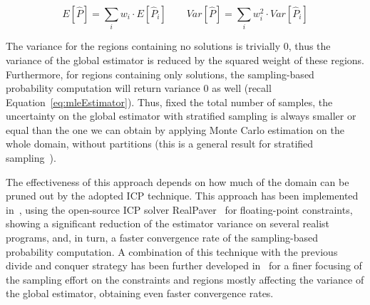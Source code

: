 \begin{equation}\label{eq:stratifiedSampling}
	E[\hat{P}]=\sum_i w_i \cdot E[\hat{P}_i] \qquad Var[\hat{P}] = \sum_i w_i^2 \cdot Var[\hat{P}_i]
\end{equation}

The variance for the regions containing no solutions is trivially 0, thus the variance of the global estimator is reduced by the squared weight of these regions. Furthermore, for regions containing only solutions, the sampling-based probability computation will return variance 0 as well (recall Equation~\eqref{eq:mleEstimator}). Thus, fixed the total number of samples, the uncertainty on the global estimator with stratified sampling is always smaller or equal than the one we can obtain by applying Monte Carlo estimation on the whole domain, without partitions (this is a general result for stratified sampling~\cite{Robert2005MCBook}). 

The effectiveness of this approach depends on how much of the domain can be pruned out by the adopted ICP technique. This approach has been implemented in~\cite{Borges2014}, using the open-source ICP solver RealPaver~\cite{granvilliers2006tomas} for floating-point constraints, showing a significant reduction of the estimator variance on several realist programs, and, in turn, a faster convergence rate of the sampling-based probability computation. A combination of this technique with the previous divide and conquer strategy has been further developed in~\cite{2015-fse-qcoral} for a finer focusing of the sampling effort on the constraints and regions mostly affecting the variance of the global estimator, obtaining even faster convergence rates.





